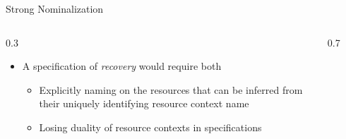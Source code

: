 \documentclass[aspectratio=169,xcolor=dvipsnames]{beamer}
\begin{document}
\begin{frame}{Strong Nominalization}
\begin{columns}
\begin{column}{0.3\textwidth}
\begin{itemize}
\item A specification of \emph{recovery} would require both
\begin{itemize}
\item Explicitly naming on the resources that can be inferred from their uniquely identifying resource context name 
\item Losing duality of resource contexts in specifications
\end{itemize}
\end{itemize}
\end{column}
\begin{column}{0.7\textwidth}
\begin{figure}
    \centering
    

\begin{tikzpicture}[x=0.75pt,y=0.75pt,yscale=-1,xscale=1]


\end{tikzpicture}
\end{figure}
\end{column}
\end{columns}
\end{frame}
\end{document}

